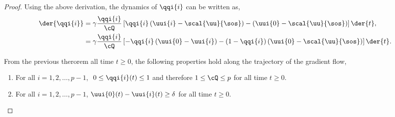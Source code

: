 \documentclass{article}
\theoremstyle{plain}
\theoremstyle{definition}
\theoremstyle{remark}
\begin{document}
\begin{proof}
Using the above derivation, the dynamics of $\qqi{i}$ can be written as,
\begin{align*}
    \der{\qqi{i}} &= \gamma \frac{\qqi{i}}{\cQ} \left[ \qqi{i} \left( \uui{i} - \scal{\uu}{\sos} \right) - \left( \uui{0} - \scal{\uu}{\sos} \right) \right] \der{t}, \\
    &= \gamma \frac{\qqi{i}}{\cQ} \left[ - \qqi{i} \left( \uui{0} - \uui{i} \right) - \left(  1 - \qqi{i} \right)\left(  \uui{0} - \scal{\uu}{\sos} \right) \right] \der{t}.
\end{align*}

From the previous therorem all time $t \geq 0$, the following properties hold along the trajectory of the gradient flow, 
\begin{enumerate}[label=(\alph*)]
    \item For all $i = 1, 2, \ldots, p-1$, $\, \, 0 \leq \qqi{i}(t) \leq 1$  and therefore $ 1 \leq \cQ \leq p$ for all time $t \geq 0$.
    \item For all $i = 1, 2, \ldots, p-1$, $\uui{0}(t) - \uui{i}(t) \geq \delta $ for all time $t \geq 0$.
\end{enumerate}


\end{proof}
\end{document}
